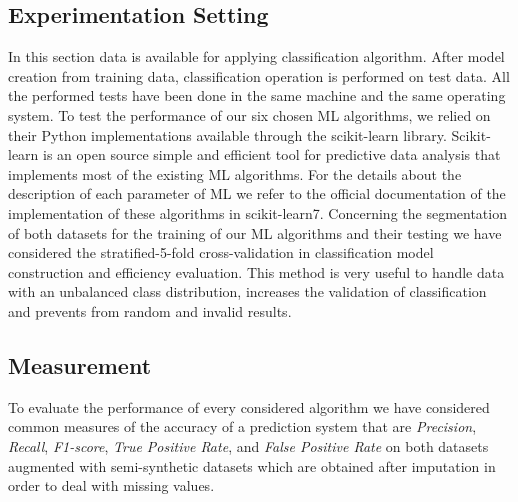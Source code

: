 \subsection{Experimentation Setting}
In this section data is available for applying classification algorithm. After model creation from training data, classification operation is performed on test data. 
All the performed tests have been done in the same machine and the same operating system. To test the performance of our six chosen ML algorithms, we relied on their Python implementations available through the scikit-learn library. Scikit-learn is an open source simple and efficient tool for predictive data analysis that implements most of the existing ML algorithms.
For the details about the description of each parameter of ML we refer to the official documentation of the implementation of these algorithms in scikit-learn7. Concerning the segmentation of both datasets for the training of our ML algorithms and their testing we have considered the stratified-5-fold cross-validation in classification model construction and efficiency evaluation. This method is very useful to handle data with an unbalanced class distribution, increases the validation of classification and prevents from random and invalid results.
\subsection{Measurement} 
To evaluate the performance of every considered algorithm we have considered common measures of the accuracy of a prediction system that are \emph{Precision}, \emph{Recall}, \emph{F1-score}, \emph{True Positive Rate}, and
 \emph{False Positive Rate} on both datasets augmented with semi-synthetic datasets which are obtained after imputation in order to deal with missing values.